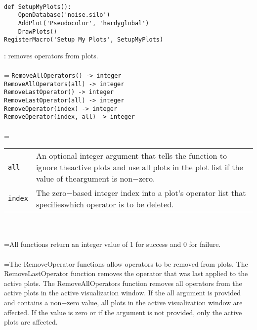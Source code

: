 \documentclass[10pt,a4paper]{report}
\begin{document}
\\[-6mm]
\begin{verbatim}def SetupMyPlots():
    OpenDatabase('noise.silo')
    AddPlot('Pseudocolor', 'hardyglobal')
    DrawPlots()
RegisterMacro('Setup My Plots', SetupMyPlots)
\end{verbatim}
\newpage


{}
: removes operators from plots.\\[-3mm]

 \\ 
\hangindent=\parindent 
\verb!RemoveAllOperators() -> integer!\\ 
\verb!RemoveAllOperators(all) -> integer!\\ 
\verb!RemoveLastOperator() -> integer!\\ 
\verb!RemoveLastOperator(all) -> integer!\\ 
\verb!RemoveOperator(index) -> integer!\\ 
\verb!RemoveOperator(index, all) -> integer!\\ [-3mm]

 \\ 
\hangindent=\parindent 
\begin{tabular}{lp{9cm}}
\verb!all! & An optional integer argument that tells the function to ignore theactive plots and use all plots in the plot list if the value of theargument is non$-$zero. \\
\verb!index! & The zero$-$based integer index into a plot's operator list that specifieswhich operator is to be deleted. \\
\end{tabular} \\[-2mm]


 \\ 
\hangindent=\parindent All functions return an integer value of 1 for success and 0 for failure. \\[-3mm] 

 \\ 
\hangindent=\parindent The RemoveOperator functions allow operators to be removed from plots. The RemoveLastOperator function removes the operator that was last applied to the active plots. The RemoveAllOperators function removes all operators from the active plots in the active visualization window. If the all argument is provided and contains a non$-$zero value, all plots in the active visualization window are affected. If the value is zero or if the argument is not provided, only the active plots are affected. \\[-3mm] 
\end{document}
